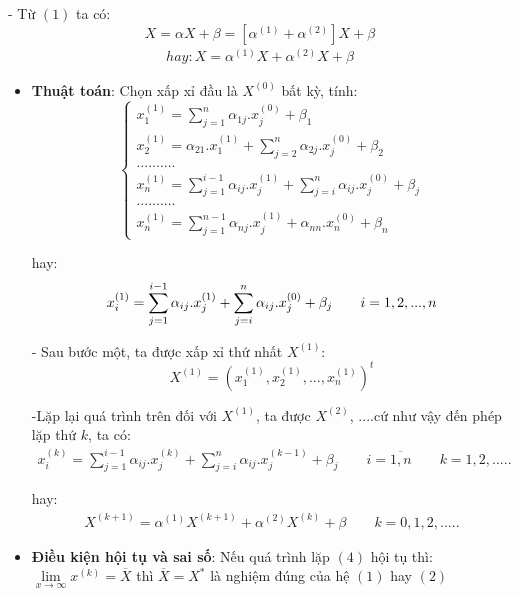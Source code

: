 \documentclass[12pt,a4paper]{article}
\begin{document}
- Từ $(1)$ ta có:
$$  X = \alpha X + \beta = [{\alpha}^{(1)} + {\alpha}^{(2)}]X + \beta  $$
\begin{align}
hay: X = {\alpha}^{(1)}X + {\alpha}^{(2)}X + \beta
\end{align}

\begin{itemize}
\item {\textbf{Thuật toán}: Chọn xấp xỉ đầu là $X^{(0)}$ bất kỳ, tính:  \\}
$$\left\{\begin{matrix} {x_1^{(1)} = \sum\limits_{j = 1}^n {{{\alpha}_{1j}.x_j^{(0)}}}  + {\beta}_1}\\{x_2^{(1)} = {\alpha}_{21}.x_1^{(1)} + \sum\limits_{j = 2}^n {{{\alpha}_{2j}.x_j^{(0)}}}  + {\beta}_2}\\{..........}\\{x_n^{(1)} = \sum\limits_{j = 1}^{i - 1} {{{\alpha}_{ij}.x_j^{(1)}}} + \sum\limits_{j = i}^{n} {{{\alpha}_{ij}.x_j^{(0)}}} + {\beta}_j}\\{..........}\\{x_n^{(1)} = \sum\limits_{j = 1}^{n - 1} {{{\alpha}_{nj}.x_j^{(1)}}} + {\alpha}_{nn}.x_n^{(0)} + {\beta}_n} \end{matrix} $$

hay: $$ x_i^{(1)} = \sum\limits_{j = 1}^{i - 1} {{{\alpha}_{ij}.x_j^{(1)}}} + \sum\limits_{j = i}^{n} {{{\alpha}_{ij}.x_j^{(0)}}} + {\beta}_j \qquad i = 1,2,...,n \\$$

- Sau bước một, ta được xấp xỉ thứ nhất $X^{(1)}$:
$$X^{(1)} = (x_1^{(1)}, x_2^{(1)}, ..., x_n^{(1)})^t $$

-Lặp lại quá trình trên đối với $X^{(1)}$, ta được $X^{(2)}$, ....cứ như vậy đến phép lặp thứ $k$, ta có:
\begin{align}
x_i^{(k)} = \sum\limits_{j = 1}^{i - 1} {{{\alpha}_{ij}.x_j^{(k)}}} + \sum\limits_{j = i}^{n} {{{\alpha}_{ij}.x_j^{(k - 1)}}} + {\beta}_j \qquad i = \overline{1,n} \qquad k = 1,2,.....
\end{align}


hay:\begin{align}
X^{(k + 1)} = {\alpha}^{(1)}X^{(k + 1)} + {\alpha}^{(2)}X^{(k)} + \beta \qquad k = 0,1,2,.....
\end{align}

\newpage

\item {\textbf{Điều kiện hội tụ và sai số}: Nếu quá trình lặp $(4)$ hội tụ thì: $\mathop {\lim }\limits_{x \to \infty } x^{(k)} = \overline{X}$ thì $\overline{X} = X^{*}$ là nghiệm đúng của hệ $(1)$ hay $(2)$\\}


\end{itemize}
\end{document}
